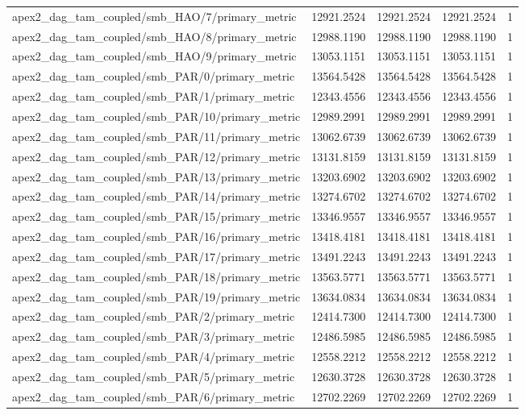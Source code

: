 \begin{table}[h]
\begin{tabular}{lrrrr}
apex2_dag_tam_coupled/smb_HAO/7/primary_metric & 12921.2524 & 12921.2524 & 12921.2524 & 1 \\
apex2_dag_tam_coupled/smb_HAO/8/primary_metric & 12988.1190 & 12988.1190 & 12988.1190 & 1 \\
apex2_dag_tam_coupled/smb_HAO/9/primary_metric & 13053.1151 & 13053.1151 & 13053.1151 & 1 \\
apex2_dag_tam_coupled/smb_PAR/0/primary_metric & 13564.5428 & 13564.5428 & 13564.5428 & 1 \\
apex2_dag_tam_coupled/smb_PAR/1/primary_metric & 12343.4556 & 12343.4556 & 12343.4556 & 1 \\
apex2_dag_tam_coupled/smb_PAR/10/primary_metric & 12989.2991 & 12989.2991 & 12989.2991 & 1 \\
apex2_dag_tam_coupled/smb_PAR/11/primary_metric & 13062.6739 & 13062.6739 & 13062.6739 & 1 \\
apex2_dag_tam_coupled/smb_PAR/12/primary_metric & 13131.8159 & 13131.8159 & 13131.8159 & 1 \\
apex2_dag_tam_coupled/smb_PAR/13/primary_metric & 13203.6902 & 13203.6902 & 13203.6902 & 1 \\
apex2_dag_tam_coupled/smb_PAR/14/primary_metric & 13274.6702 & 13274.6702 & 13274.6702 & 1 \\
apex2_dag_tam_coupled/smb_PAR/15/primary_metric & 13346.9557 & 13346.9557 & 13346.9557 & 1 \\
apex2_dag_tam_coupled/smb_PAR/16/primary_metric & 13418.4181 & 13418.4181 & 13418.4181 & 1 \\
apex2_dag_tam_coupled/smb_PAR/17/primary_metric & 13491.2243 & 13491.2243 & 13491.2243 & 1 \\
apex2_dag_tam_coupled/smb_PAR/18/primary_metric & 13563.5771 & 13563.5771 & 13563.5771 & 1 \\
apex2_dag_tam_coupled/smb_PAR/19/primary_metric & 13634.0834 & 13634.0834 & 13634.0834 & 1 \\
apex2_dag_tam_coupled/smb_PAR/2/primary_metric & 12414.7300 & 12414.7300 & 12414.7300 & 1 \\
apex2_dag_tam_coupled/smb_PAR/3/primary_metric & 12486.5985 & 12486.5985 & 12486.5985 & 1 \\
apex2_dag_tam_coupled/smb_PAR/4/primary_metric & 12558.2212 & 12558.2212 & 12558.2212 & 1 \\
apex2_dag_tam_coupled/smb_PAR/5/primary_metric & 12630.3728 & 12630.3728 & 12630.3728 & 1 \\
apex2_dag_tam_coupled/smb_PAR/6/primary_metric & 12702.2269 & 12702.2269 & 12702.2269 & 1 \\

\end{tabular}
\end{table}
